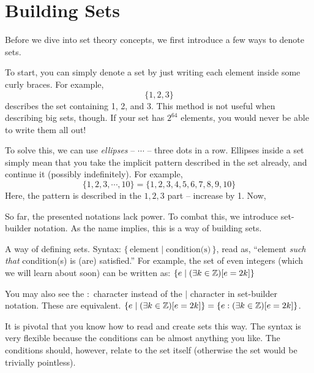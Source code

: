 \documentclass[main.tex]{subfiles}
\begin{document}
\section{Building Sets}

Before we dive into set theory concepts, we first introduce a few ways to denote sets.

To start, you can simply denote a set by just writing each element inside some curly braces. For example, \[\{1,2,3\}\] describes the set containing 1, 2, and 3. This method is not useful when describing big sets, though. If your set has \(2^{64}\) elements, you would never be able to write them all out!

To solve this, we can use \textit{ellipses} -- \(\cdots\) -- three dots in a row. Ellipses inside a set simply mean that you take the implicit pattern described in the set already, and continue it (possibly indefinitely). For example, \[\{1,2,3,\cdots,10\} = \{1,2,3,4,5,6,7,8,9,10\}\]
Here, the pattern is described in the \(1,2,3\) part -- increase by 1. Now, 

So far, the presented notations lack power. To combat this, we introduce set-builder notation. As the name implies, this is a way of building sets.

\begin{defn}
	A way of defining sets. Syntax: \(\{\,\mbox{element} \mid \mbox{condition(s)}\,\}\), read as, ``element \textit{such that} condition(s) is (are) satisfied.'' For example, the set of even integers (which we will learn about soon) can be written as: \(\{e \mid (\exists k \in \mathbb{Z})[e = 2k]\}\)
\end{defn}

\begin{rem}
	You may also see the \(:\) character instead of the \(\mid\) character in set-builder notation. These are equivalent. \(\{e \mid (\exists k \in \mathbb{Z})[e = 2k]\} = \{e : (\exists k \in \mathbb{Z})[e = 2k]\}\).
\end{rem}

It is pivotal that you know how to read and create sets this way. The syntax is very flexible because the conditions can be almost anything you like. The conditions should, however, relate to the set itself (otherwise the set would be trivially pointless).

\end{document}
